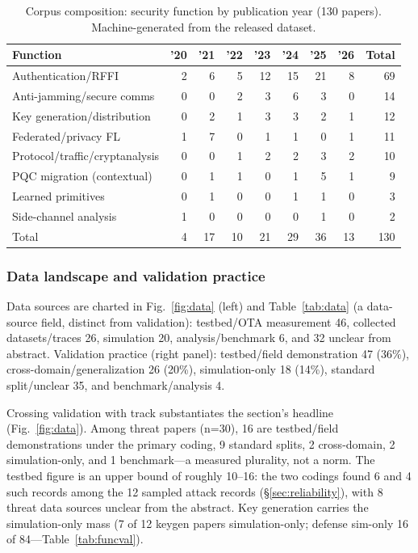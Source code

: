 \documentclass[10.5pt,compsoc,winfonts]{ICN}
\begin{document}
\begin{table}[tbp]
\footnotesize
\centering
\caption{Corpus composition: security function by publication year (130 papers). Machine-generated from the released dataset.}
\label{tab:functions}
\begin{tabular}{lrrrrrrrr}
\toprule
Function & '20 & '21 & '22 & '23 & '24 & '25 & '26 & Total \\
\midrule
Authentication/RFFI & 2 & 6 & 5 & 12 & 15 & 21 & 8 & 69 \\
Anti-jamming/secure comms & 0 & 0 & 2 & 3 & 6 & 3 & 0 & 14 \\
Key generation/distribution & 0 & 2 & 1 & 3 & 3 & 2 & 1 & 12 \\
Federated/privacy FL & 1 & 7 & 0 & 1 & 1 & 0 & 1 & 11 \\
Protocol/traffic/cryptanalysis & 0 & 0 & 1 & 2 & 2 & 3 & 2 & 10 \\
PQC migration (contextual) & 0 & 1 & 1 & 0 & 1 & 5 & 1 & 9 \\
Learned primitives & 0 & 1 & 0 & 0 & 1 & 1 & 0 & 3 \\
Side-channel analysis & 1 & 0 & 0 & 0 & 0 & 1 & 0 & 2 \\
Total & 4 & 17 & 10 & 21 & 29 & 36 & 13 & 130 \\
\bottomrule
\end{tabular}
\end{table}

\subsubsection{Data landscape and validation practice}
Data sources are charted in Fig.~\ref{fig:data} (left) and Table~\ref{tab:data} (a data-source field, distinct from validation): testbed/OTA measurement 46, collected datasets/traces 26, simulation 20, analysis/benchmark 6, and 32 unclear from abstract. Validation practice (right panel): testbed/field demonstration 47 (36\%), cross-domain/generalization 26 (20\%), simulation-only 18 (14\%), standard split/unclear 35, and benchmark/analysis 4.

Crossing validation with track substantiates the section's headline (Fig.~\ref{fig:data}). Among threat papers (n=30), 16 are testbed/field demonstrations under the primary coding, 9 standard splits, 2 cross-domain, 2 simulation-only, and 1 benchmark—a measured plurality, not a norm. The testbed figure is an upper bound of roughly 10–16: the two codings found 6 and 4 such records among the 12 sampled attack records (\S\ref{sec:reliability}), with 8 threat data sources unclear from the abstract. Key generation carries the simulation-only mass (7 of 12 keygen papers simulation-only; defense sim-only 16 of 84—Table~\ref{tab:funcval}).
\end{document}
